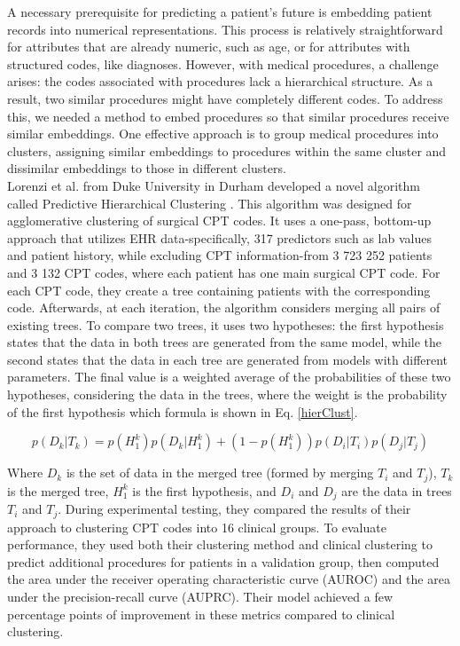 
A necessary prerequisite for predicting a patient’s future is embedding patient records into numerical representations. This process is relatively straightforward for attributes that are already numeric, such as age, or for attributes with structured codes, like diagnoses. However, with medical procedures, a challenge arises: the codes associated with procedures lack a hierarchical structure. As a result, two similar procedures might have completely different codes. To address this, we needed a method to embed procedures so that similar procedures receive similar embeddings. One effective approach is to group medical procedures into clusters, assigning similar embeddings to procedures within the same cluster and dissimilar embeddings to those in different clusters.
\\

Lorenzi et al. from Duke University in Durham developed a novel algorithm called Predictive Hierarchical Clustering \cite{lorenzi2017predictive}. This algorithm was designed for agglomerative clustering of surgical CPT codes. It uses a one-pass, bottom-up approach that utilizes EHR data-specifically, 317 predictors such as lab values and patient history, while excluding CPT information-from 3 723 252 patients and 3 132 CPT codes, where each patient has one main surgical CPT code. For each CPT code, they create a tree containing patients with the corresponding code. Afterwards, at each iteration, the algorithm considers merging all pairs of existing trees. To compare two trees, it uses two hypotheses: the first hypothesis states that the data in both trees are generated from the same model, while the second states that the data in each tree are generated from models with different parameters. The final value is a weighted average of the probabilities of these two hypotheses, considering the data in the trees, where the weight is the probability of the first hypothesis which formula is shown in Eq. \ref{hierClust}.

\begin{equation}
	\label{hierClust}
	p(D_k \vert T_k) = p(H_1^k)p(D_k \vert H_1^k) + (1 - p(H_1^k))p(D_i \vert T_i)p(D_j \vert T_j)
\end{equation} 

Where $D_k$ is the set of data in the merged tree (formed by merging $T_i$ and $T_j$), $T_k$ is the merged tree, $H_1^k$ is the first hypothesis, and $D_i$ and $D_j$ are the data in trees $T_i$ and $T_j$. During experimental testing, they compared the results of their approach to clustering CPT codes into 16 clinical groups. To evaluate performance, they used both their clustering method and clinical clustering to predict additional procedures for patients in a validation group, then computed the area under the receiver operating characteristic curve (AUROC) and the area under the precision-recall curve (AUPRC). Their model achieved a few percentage points of improvement in these metrics compared to clinical clustering.
\\

